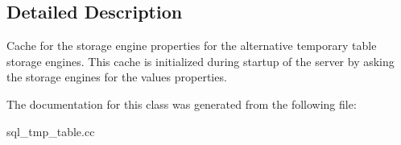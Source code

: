 \subsection{Detailed Description}
Cache for the storage engine properties for the alternative temporary table storage engines. This cache is initialized during startup of the server by asking the storage engines for the values properties. 

The documentation for this class was generated from the following file\+:\begin{DoxyCompactItemize}
\item 
sql\+\_\+tmp\+\_\+table.\+cc\end{DoxyCompactItemize}
